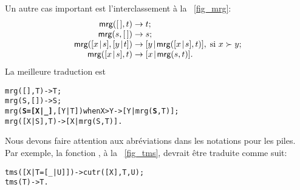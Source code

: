 \noindent Un autre cas important est l'interclassement à la
\fig~\vref{fig_mrg}:
\begin{equation*}
\begin{array}{@{}r@{\;}l@{\;}l@{}}
\fun{mrg}(\el,t)         & \rightarrow & t;\\
\fun{mrg}(s,\el)         & \rightarrow & s;\\
\fun{mrg}(\cons{x}{s},\cons{y}{t}) & \rightarrow
& \cons{y}{\fun{mrg}(\cons{x}{s},t)},\;\text{si \(x \succ y\)};\\
\fun{mrg}(\cons{x}{s},t) & \rightarrow
                         & \cons{x}{\fun{mrg}(s,t)}.
\end{array}
\end{equation*}
La meilleure traduction est
\begin{alltt}
mrg(     [],    T)            -> T;
mrg(     S,    [])            -> S;
mrg(\textbf{S=[X|\_]},[Y|T]) when X > Y -> [Y|mrg(\textbf{S},T)];
mrg(  [X|S],    T)            -> [X|mrg(S,T)].
\end{alltt}
Nous devons faire attention aux abréviations dans les notations pour
les piles. Par exemple, la fonction , à la
\fig~\vref{fig_tms}, devrait être traduite comme suit:
\begin{alltt}
tms([X|T=[\_|U]]) -> cutr([X],T,U);
tms(          T) -> T.
\end{alltt}

